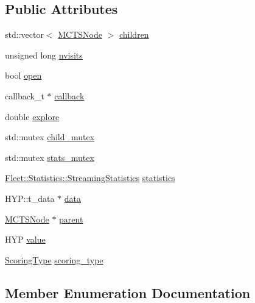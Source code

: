 \subsection*{Public Attributes}
\begin{DoxyCompactItemize}
\item 
std\+::vector$<$ \hyperlink{class_m_c_t_s_node}{M\+C\+T\+S\+Node} $>$ \hyperlink{class_m_c_t_s_node_aeb74f8b007995f5a3bd7da2b37e8ae2c}{children}
\item 
unsigned long \hyperlink{class_m_c_t_s_node_afe230ccb2748cb60328c7e9bbfdfc0a2}{nvisits}
\item 
bool \hyperlink{class_m_c_t_s_node_a406077cff81145c885ee395cd8553744}{open}
\item 
callback\+\_\+t $\ast$ \hyperlink{class_m_c_t_s_node_aa02cc56ca94e1ce0449aed1c3def8737}{callback}
\item 
double \hyperlink{class_m_c_t_s_node_a4d21a4368a893b5ccb4acb2ea3286a52}{explore}
\item 
std\+::mutex \hyperlink{class_m_c_t_s_node_a7e8d861893740e86d183475ab4314c86}{child\+\_\+mutex}
\item 
std\+::mutex \hyperlink{class_m_c_t_s_node_a949477285b64ab1f84f81834f1a7ab0d}{stats\+\_\+mutex}
\item 
\hyperlink{class_fleet_1_1_statistics_1_1_streaming_statistics}{Fleet\+::\+Statistics\+::\+Streaming\+Statistics} \hyperlink{class_m_c_t_s_node_af223a24db35d4f81d0ab73a42cb7e1bc}{statistics}
\item 
H\+Y\+P\+::t\+\_\+data $\ast$ \hyperlink{class_m_c_t_s_node_aa09754a1e98bcacb4eecb0840a11fced}{data}
\item 
\hyperlink{class_m_c_t_s_node}{M\+C\+T\+S\+Node} $\ast$ \hyperlink{class_m_c_t_s_node_afd7d3f1262b41d10b42a5721ac95af68}{parent}
\item 
H\+YP \hyperlink{class_m_c_t_s_node_a5bf1a60214369c7a5bc6b166dcdffe3d}{value}
\item 
\hyperlink{class_m_c_t_s_node_a5a201dc80c97c1b65503161f7e5603f6}{Scoring\+Type} \hyperlink{class_m_c_t_s_node_a4bf717abcd090cc24d9a9d6452246c09}{scoring\+\_\+type}
\end{DoxyCompactItemize}


\subsection{Member Enumeration Documentation}
\mbox{\label{class_m_c_t_s_node_a5a201dc80c97c1b65503161f7e5603f6}} 
